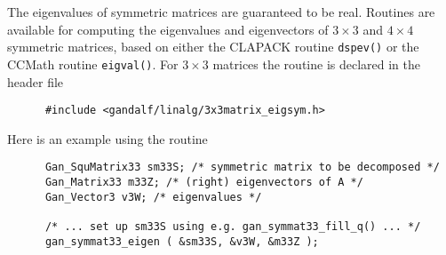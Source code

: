 The eigenvalues of symmetric matrices are guaranteed to be real.
Routines are available for computing the eigenvalues and eigenvectors of
$3\times 3$ and $4\times 4$ symmetric matrices, based on either the
CLAPACK routine {\tt dspev()} or the CCMath routine {\tt eigval()}.
For $3\times 3$ matrices the routine is declared in the header file
\begin{verbatim}
      #include <gandalf/linalg/3x3matrix_eigsym.h>
\end{verbatim}
Here is an example using the routine
\begin{verbatim}
      Gan_SquMatrix33 sm33S; /* symmetric matrix to be decomposed */
      Gan_Matrix33 m33Z; /* (right) eigenvectors of A */
      Gan_Vector3 v3W; /* eigenvalues */

      /* ... set up sm33S using e.g. gan_symmat33_fill_q() ... */
      gan_symmat33_eigen ( &sm33S, &v3W, &m33Z );
\end{verbatim}

